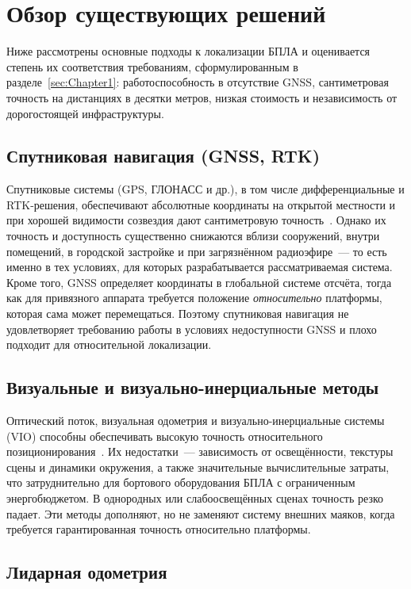 \section{Обзор существующих решений}
\label{sec:Chapter2}

Ниже рассмотрены основные подходы к локализации БПЛА и оценивается степень их
соответствия требованиям, сформулированным в разделе~\ref{sec:Chapter1}:
работоспособность в отсутствие GNSS, сантиметровая точность на дистанциях в
десятки метров, низкая стоимость и независимость от дорогостоящей инфраструктуры.

\subsection{Спутниковая навигация (GNSS, RTK)}

Спутниковые системы (GPS, ГЛОНАСС и др.), в том числе дифференциальные и
RTK-решения, обеспечивают абсолютные координаты на открытой местности и при
хорошей видимости созвездия дают сантиметровую точность~\cite{kaplan2005,misra2006}.
Однако их точность и доступность существенно снижаются вблизи сооружений, внутри
помещений, в городской застройке и при загрязнённом радиоэфире~--- то есть именно
в тех условиях, для которых разрабатывается рассматриваемая система. Кроме того,
GNSS определяет координаты в глобальной системе отсчёта, тогда как для привязного
аппарата требуется положение \emph{относительно} платформы, которая сама может
перемещаться. Поэтому спутниковая навигация не удовлетворяет требованию работы в
условиях недоступности GNSS и плохо подходит для относительной локализации.

\subsection{Визуальные и визуально-инерциальные методы}

Оптический поток, визуальная одометрия и визуально-инерциальные системы (VIO)
способны обеспечивать высокую точность относительного позиционирования~\cite{scaramuzza2011}. Их
недостатки~--- зависимость от освещённости, текстуры сцены и динамики окружения, а
также значительные вычислительные затраты, что затруднительно для бортового
оборудования БПЛА с ограниченным энергобюджетом. В однородных или
слабоосвещённых сценах точность резко падает. Эти методы дополняют, но не заменяют
систему внешних маяков, когда требуется гарантированная точность относительно
платформы.

\subsection{Лидарная одометрия}


